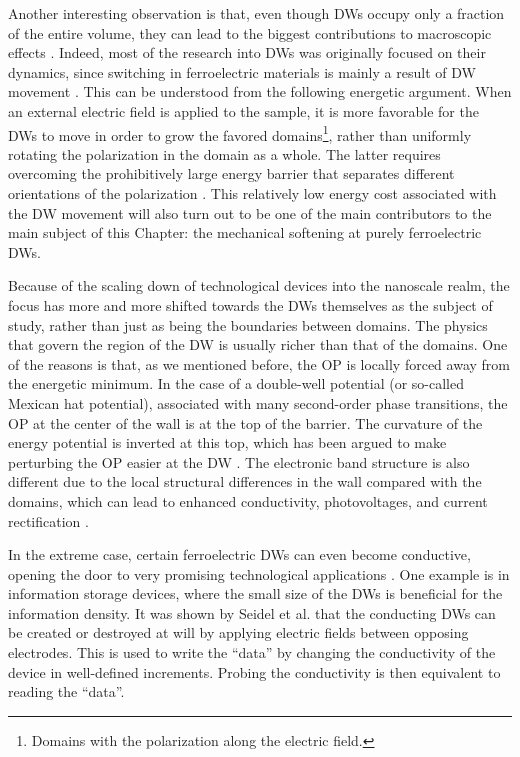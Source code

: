 Another interesting observation is that, even though \glspl{DW} occupy only a fraction of the entire volume, they can lead to the biggest contributions to macroscopic effects \cite{Schranz2012}. 
Indeed, most of the research into \glspl{DW} was originally focused on their dynamics, since switching in ferroelectric materials is mainly a result of \gls{DW} movement \cite{Merz1954,Gao2013}.
This can be understood from the following energetic argument.
When an external electric field is applied to the sample, it is more favorable for the \glspl{DW} to move in order to grow the favored domains\footnote{Domains with the polarization along the electric field.}, rather than uniformly rotating the polarization in the domain as a whole.
The latter requires overcoming the prohibitively large energy barrier that separates different orientations of the polarization \cite{Tagantsev2010}.
This relatively low energy cost associated with the \gls{DW} movement will also turn out to be one of the main contributors to the main subject of this Chapter: the mechanical softening at purely ferroelectric \glspl{DW}.

Because of the scaling down of technological devices into the nanoscale realm, the focus has more and more shifted towards the \glspl{DW} themselves as the subject of study, rather than just as being the boundaries between domains.
The physics that govern the region of the \gls{DW} is usually richer than that of the domains. One of the reasons is that, as we mentioned before, the \gls{OP} is locally forced away from the energetic minimum.
In the case of a double-well potential (or so-called Mexican hat potential), associated with many second-order phase transitions, the \gls{OP} at the center of the wall is at the top of the barrier.
The curvature of the energy potential is inverted at this top, which has been argued to make perturbing the \gls{OP} easier at the \gls{DW} \cite{Scott2012}.
The electronic band structure is also different due to the local structural differences in the wall compared with the domains, which can lead to enhanced conductivity, photovoltages, and current rectification \cite{Inoue2015,Korbel2018,Korbel2020,Huyan2019}.

In the extreme case, certain ferroelectric \glspl{DW} can even become conductive, opening the door to very promising technological applications \cite{Seidel2009}.
One example is in information storage devices, where the small size of the \glspl{DW} is beneficial for the information density.
It was shown by Seidel et al.\cite{Seidel2009} that the conducting \glspl{DW} can be created or destroyed at will by applying electric fields between opposing electrodes. This is used to write the ``data'' by changing the conductivity of the device in well-defined increments.
Probing the conductivity is then equivalent to reading the ``data''. 

